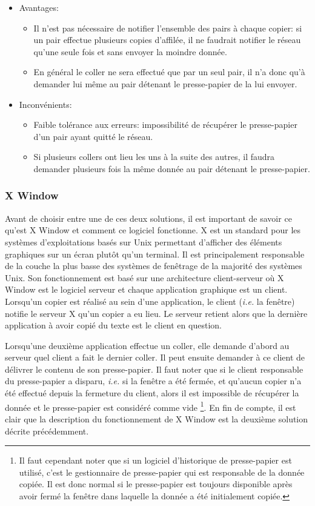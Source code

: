 \begin{itemize}
\item Avantages:
  \begin{itemize}
  \item Il n'est pas nécessaire de notifier l'ensemble des pairs à chaque
    copier: si un pair effectue plusieurs copies d'affilée, il ne faudrait
    notifier le réseau qu'une seule fois et sans envoyer la moindre donnée.
  \item En général le coller ne sera effectué que par un seul pair,
    il n'a donc qu'à demander lui même au pair détenant le presse-papier
    de la lui envoyer.
  \end{itemize}
\item Inconvénients:
  \begin{itemize}
  \item Faible tolérance aux erreurs: impossibilité de récupérer le
    pres\-se-pa\-pier d'un pair ayant quitté le réseau.
  \item Si plusieurs collers ont lieu les uns à la suite des autres, il faudra
    demander plusieurs fois la même donnée au pair détenant le presse-papier.\\
  \end{itemize}
\end{itemize}

\subsubsection{X Window}
Avant de choisir entre une de ces deux solutions, il est important de
savoir ce qu'est X Window et comment ce logiciel fonctionne\cite{nye1992xlib}.
X est un standard pour les systèmes d'exploitations basés sur Unix permettant
d'afficher des éléments graphiques sur un écran plutôt qu'un terminal.
Il est principalement responsable de la couche la plus basse des systèmes
de fenêtrage de la majorité des systèmes Unix. Son fonctionnement est basé
sur une architecture client-serveur où X Window est le logiciel serveur
et chaque application graphique est un client. Lorsqu'un copier est réalisé au
sein d'une application, le client (\emph{i.e.} la fenêtre) notifie le serveur X
qu'un copier a eu lieu. Le serveur retient alors que la dernière application
à avoir copié du texte est le client en question.

Lorsqu'une deuxième
application effectue un coller, elle demande d'abord au serveur quel client
a fait le dernier coller. Il peut ensuite demander à ce client de délivrer
le contenu de son presse-papier. Il faut noter que si le client responsable
du presse-papier a disparu, \emph{i.e.} si la fenêtre a été fermée, et qu'aucun
copier n'a été effectué depuis la fermeture du client, alors il est
impossible de récupérer la donnée et le presse-papier est considéré comme vide
\footnote{Il faut cependant noter que si un logiciel d'historique de
presse-papier est utilisé, c'est le gestionnaire de presse-papier qui est
responsable de la donnée copiée. Il est donc normal si le presse-papier est
toujours disponible après avoir fermé la fenêtre dans laquelle la donnée a été
initialement copiée.}.
En fin de compte, il est clair que la description du fonctionnement de X Window
est la deuxième solution décrite précédemment.

